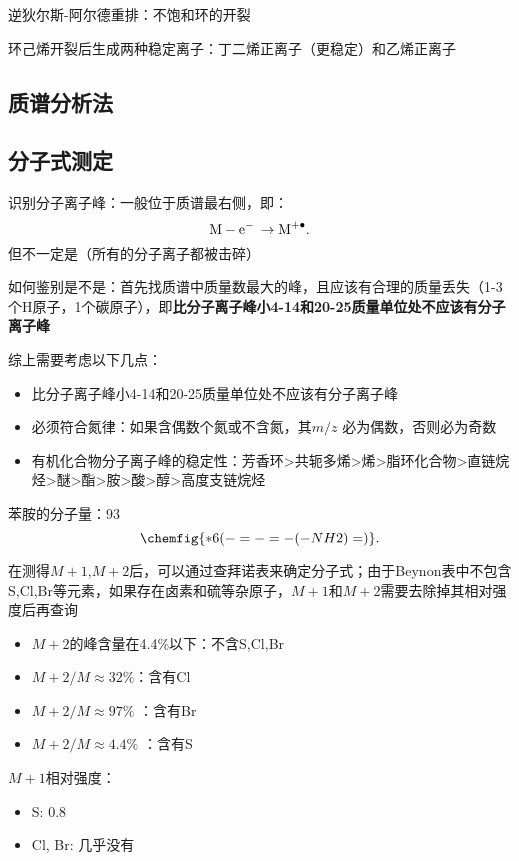 \begin{notation}
    逆狄尔斯-阿尔德重排：不饱和环的开裂
    \begin{eg}
        环己烯开裂后生成两种稳定离子：丁二烯正离子（更稳定）和乙烯正离子
    \end{eg}
\end{notation}
\subsection{质谱分析法}%
\label{sub:质谱分析法}
\subsection{分子式测定}%
\label{sub:分子式测定}
\begin{notation}
    识别分子离子峰：一般位于质谱最右侧，即：\[
        \ce{M - e- \to M^{+.}}
    .\]
    但不一定是（所有的分子离子都被击碎）

    如何鉴别是不是：首先找质谱中质量数最大的峰，且应该有合理的质量丢失（1-3个H原子，1个碳原子），即\textbf{比分子离子峰小4-14和20-25质量单位处不应该有分子离子峰}

    综上需要考虑以下几点：
    \begin{itemize}
        \item 比分子离子峰小4-14和20-25质量单位处不应该有分子离子峰
        \item 必须符合氮律：如果含偶数个氮或不含氮，其$m / z$ 必为偶数，否则必为奇数
        \item 有机化合物分子离子峰的稳定性：芳香环>共轭多烯>烯>脂环化合物>直链烷烃>醚>酯>胺>酸>醇>高度支链烷烃
    \end{itemize}
\end{notation}
\begin{eg}
    苯胺的分子量：93
    \[
    \chemfig{*6(-=-=-(-NH2)=)}
    .\]
\end{eg}
在测得$M+1$,$M+2$后，可以通过查拜诺表来确定分子式；由于Beynon表中不包含S,Cl,Br等元素，如果存在卤素和硫等杂原子，$M+1$和$M+2$需要去除掉其相对强度后再查询
\begin{itemize}
    \item $M+2$的峰含量在4.4\%以下：不含S,Cl,Br
    \item $\text{$M+2 / M $}\approx 32\%$：含有Cl
    \item $\text{$M+2 / M $}\approx 97\%$ ：含有Br
    \item $\text{$M+2 / M $}\approx 4.4\%$ ：含有S
\end{itemize}
$M+1$相对强度：
\begin{itemize}
    \item S: 0.8
    \item Cl, Br: 几乎没有
\end{itemize}

